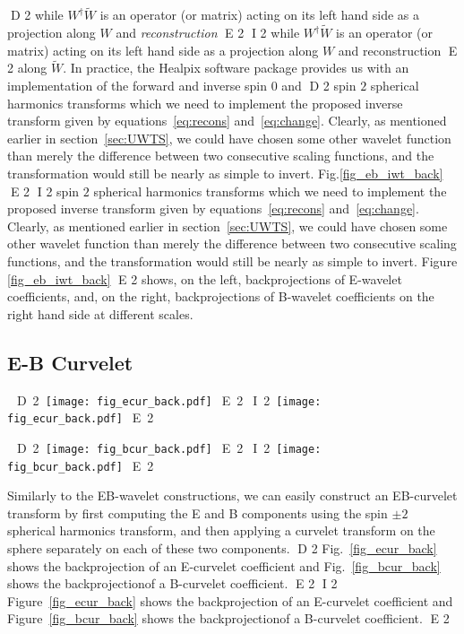 D 2
while $W^\dagger \tilde{W}$ is an operator (or matrix) acting on its left hand side as a projection along $W$ and \emph{reconstruction} 
E 2
I 2
while $W^\dagger \tilde{W}$ is an operator (or matrix) acting on its left hand side as a projection along $W$ and reconstruction 
E 2
along $\tilde{W}$. In practice, the Healpix software package provides us with an implementation of the forward and inverse spin $0$ and 
D 2
spin $2$ spherical harmonics transforms which we need to implement the proposed inverse transform given by equations~\ref{eq:recons} 
and~\ref{eq:change}. Clearly, as mentioned earlier in section~\ref{sec:UWTS}, we could have chosen some other wavelet function than merely 
the difference between two consecutive scaling functions, and the transformation would still be nearly as simple to invert. Fig.\ref{fig_eb_iwt_back} 
E 2
I 2
spin $2$ spherical harmonics transforms which we need to implement the proposed inverse transform given by equations~\eqref{eq:recons} 
and~\eqref{eq:change}. Clearly, as mentioned earlier in section~\ref{sec:UWTS}, we could have chosen some other wavelet function than merely 
the difference between two consecutive scaling functions, and the transformation would still be nearly as simple to invert. Figure \ref{fig_eb_iwt_back} 
E 2
shows, on the left, backprojections of E-wavelet coefficients, and, on the right, backprojections of B-wavelet coefficients on the right hand side at different scales.

\subsection*{E-B  Curvelet}
\begin{figure*}[htb]
\centerline{
\vbox{
 \hbox{
D 2
 \texttt{[image: fig\_ecur\_back.pdf]}
E 2
I 2
 \texttt{[image: fig\_ecur\_back.pdf]}
E 2
 }
  }
 }
\caption{E-curvelet coefficient backprojection.}
\label{fig_ecur_back}
\end{figure*}

\begin{figure*}[htb]
\centerline{
\vbox{
 \hbox{
D 2
 \texttt{[image: fig\_bcur\_back.pdf]}
E 2
I 2
 \texttt{[image: fig\_bcur\_back.pdf]}
E 2
 }
 }
 }
\caption{B-curvelet coefficient backprojection.}
\label{fig_bcur_back}
\end{figure*}
Similarly to the EB-wavelet constructions, we can easily construct an EB-curvelet transform by first computing the E and B components using 
the spin $\pm 2$ spherical harmonics transform, and then applying a curvelet transform on the sphere separately on each of these two components.
D 2
Fig.~\ref{fig_ecur_back} shows the backprojection of an E-curvelet coefficient and Fig.~\ref{fig_bcur_back} shows the backprojectionof a B-curvelet coefficient.
E 2
I 2
Figure~\ref{fig_ecur_back} shows the backprojection of an E-curvelet coefficient and Figure~\ref{fig_bcur_back} shows the backprojectionof a B-curvelet coefficient.
E 2

